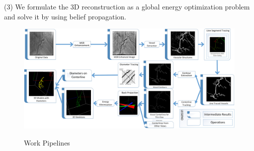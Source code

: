 (3) We formulate the 3D reconstruction as a global energy
optimization problem and solve it by using belief propagation.


\begin{figure}
  \centering
  \includegraphics[width=6.0in]{procedure.png}\\
  \caption{Work Pipelines}\label{fig:procedure}
\end{figure}
